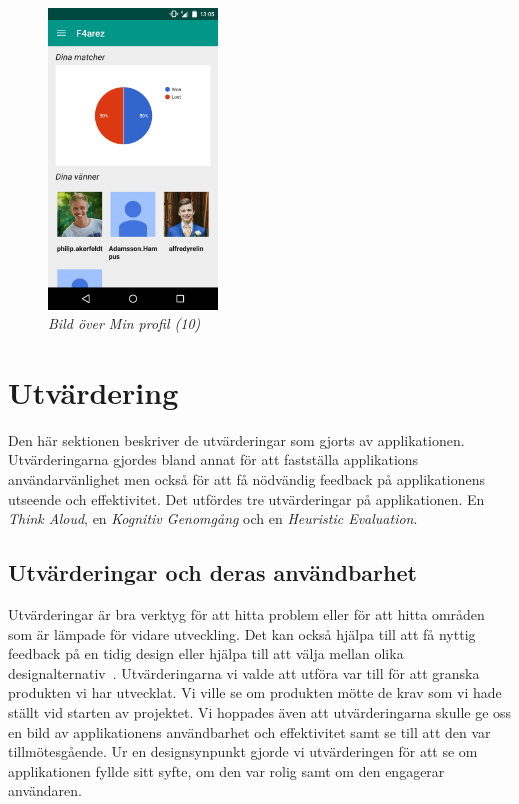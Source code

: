 \documentclass[a4paper, 11pt]{article}
\begin{document}
\begin{figure}[H]
	\begin{center}
	\includegraphics[width=0.4\textwidth]{app_profile} 
	\end{center}
	\caption{\textit{Bild över Min profil (10)}}
\end{figure}

\newpage
\section{Utvärdering}
Den här sektionen beskriver de utvärderingar som gjorts av applikationen. Utvärderingarna gjordes bland annat för att fastställa applikations användarvänlighet men också för att få nödvändig feedback på applikationens utseende och effektivitet. Det utfördes tre utvärderingar på applikationen. En \textit{Think Aloud}, en \textit{Kognitiv Genomgång} och en \textit{Heuristic Evaluation}. 

\subsection{Utvärderingar och deras användbarhet}
Utvärderingar är bra verktyg för att hitta problem eller för att hitta områden som är lämpade för vidare utveckling. Det kan också hjälpa till att få nyttig feedback på en tidig design eller hjälpa till att välja mellan olika designalternativ~\cite[sid 226--228]{benyon2010designing}. Utvärderingarna vi valde att utföra var till för att granska produkten vi har utvecklat. Vi ville se om produkten mötte de krav som vi hade ställt vid starten av projektet. Vi hoppades även att utvärderingarna skulle ge oss en bild av applikationens användbarhet och effektivitet samt se till att den var tillmötesgående. Ur en designsynpunkt gjorde vi utvärderingen för att se om applikationen fyllde sitt syfte, om den var rolig samt om den engagerar användaren.
\end{document}
